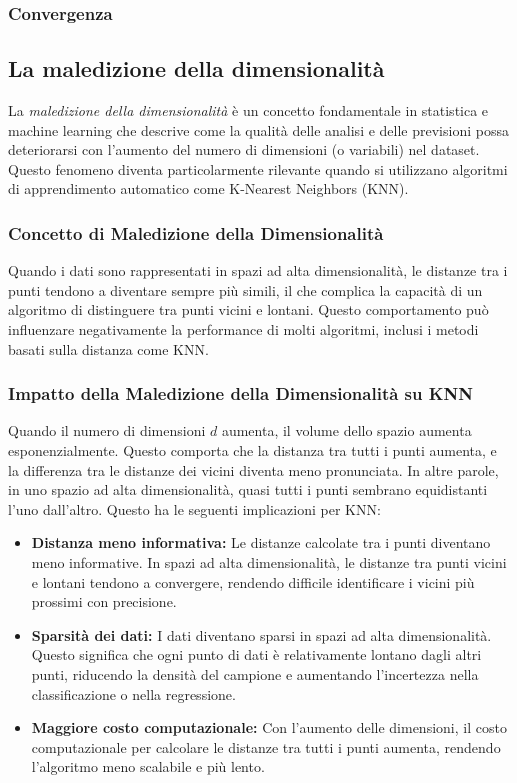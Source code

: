 \subsubsection{Convergenza}

\subsection{La maledizione della dimensionalità}
La \textit{maledizione della dimensionalità} è un concetto fondamentale in statistica e machine learning che descrive come la qualità delle analisi e delle previsioni possa deteriorarsi con l'aumento del numero di dimensioni (o variabili) nel dataset. Questo fenomeno diventa particolarmente rilevante quando si utilizzano algoritmi di apprendimento automatico come K-Nearest Neighbors (KNN).

\subsubsection{Concetto di Maledizione della Dimensionalità}

Quando i dati sono rappresentati in spazi ad alta dimensionalità, le distanze tra i punti tendono a diventare sempre più simili, il che complica la capacità di un algoritmo di distinguere tra punti vicini e lontani. Questo comportamento può influenzare negativamente la performance di molti algoritmi, inclusi i metodi basati sulla distanza come KNN.

\subsubsection{Impatto della Maledizione della Dimensionalità su KNN}

Quando il numero di dimensioni \(d\) aumenta, il volume dello spazio aumenta esponenzialmente. Questo comporta che la distanza tra tutti i punti aumenta, e la differenza tra le distanze dei vicini diventa meno pronunciata. In altre parole, in uno spazio ad alta dimensionalità, quasi tutti i punti sembrano equidistanti l'uno dall'altro. Questo ha le seguenti implicazioni per KNN:

\begin{itemize}
    \item \textbf{Distanza meno informativa:} Le distanze calcolate tra i punti diventano meno informative. In spazi ad alta dimensionalità, le distanze tra punti vicini e lontani tendono a convergere, rendendo difficile identificare i vicini più prossimi con precisione.
    
    \item \textbf{Sparsità dei dati:} I dati diventano sparsi in spazi ad alta dimensionalità. Questo significa che ogni punto di dati è relativamente lontano dagli altri punti, riducendo la densità del campione e aumentando l'incertezza nella classificazione o nella regressione.

    \item \textbf{Maggiore costo computazionale:} Con l'aumento delle dimensioni, il costo computazionale per calcolare le distanze tra tutti i punti aumenta, rendendo l'algoritmo meno scalabile e più lento.
\end{itemize}

